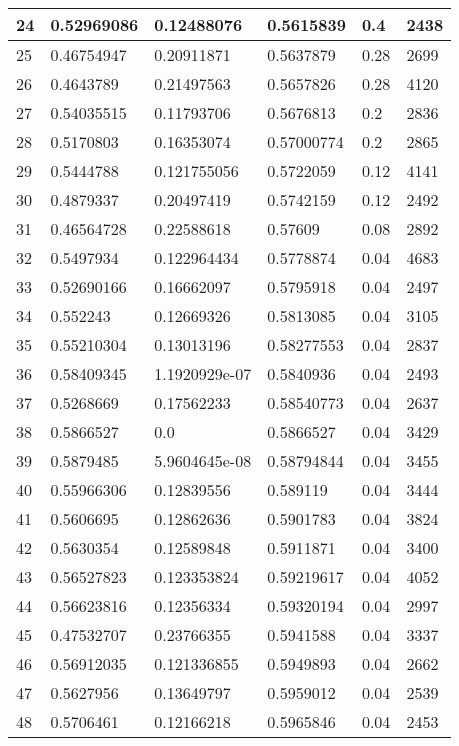 \begin{longtable}{|l|l|l|l|l|l|}
24 & 0.52969086 & 0.12488076 & 0.5615839 & 0.4 & 2438 \\ \hline 
25 & 0.46754947 & 0.20911871 & 0.5637879 & 0.28 & 2699 \\ \hline 
26 & 0.4643789 & 0.21497563 & 0.5657826 & 0.28 & 4120 \\ \hline 
27 & 0.54035515 & 0.11793706 & 0.5676813 & 0.2 & 2836 \\ \hline 
28 & 0.5170803 & 0.16353074 & 0.57000774 & 0.2 & 2865 \\ \hline 
29 & 0.5444788 & 0.121755056 & 0.5722059 & 0.12 & 4141 \\ \hline 
30 & 0.4879337 & 0.20497419 & 0.5742159 & 0.12 & 2492 \\ \hline 
31 & 0.46564728 & 0.22588618 & 0.57609 & 0.08 & 2892 \\ \hline 
32 & 0.5497934 & 0.122964434 & 0.5778874 & 0.04 & 4683 \\ \hline 
33 & 0.52690166 & 0.16662097 & 0.5795918 & 0.04 & 2497 \\ \hline 
34 & 0.552243 & 0.12669326 & 0.5813085 & 0.04 & 3105 \\ \hline 
35 & 0.55210304 & 0.13013196 & 0.58277553 & 0.04 & 2837 \\ \hline 
36 & 0.58409345 & 1.1920929e-07 & 0.5840936 & 0.04 & 2493 \\ \hline 
37 & 0.5268669 & 0.17562233 & 0.58540773 & 0.04 & 2637 \\ \hline 
38 & 0.5866527 & 0.0 & 0.5866527 & 0.04 & 3429 \\ \hline 
39 & 0.5879485 & 5.9604645e-08 & 0.58794844 & 0.04 & 3455 \\ \hline 
40 & 0.55966306 & 0.12839556 & 0.589119 & 0.04 & 3444 \\ \hline 
41 & 0.5606695 & 0.12862636 & 0.5901783 & 0.04 & 3824 \\ \hline 
42 & 0.5630354 & 0.12589848 & 0.5911871 & 0.04 & 3400 \\ \hline 
43 & 0.56527823 & 0.123353824 & 0.59219617 & 0.04 & 4052 \\ \hline 
44 & 0.56623816 & 0.12356334 & 0.59320194 & 0.04 & 2997 \\ \hline 
45 & 0.47532707 & 0.23766355 & 0.5941588 & 0.04 & 3337 \\ \hline 
46 & 0.56912035 & 0.121336855 & 0.5949893 & 0.04 & 2662 \\ \hline 
47 & 0.5627956 & 0.13649797 & 0.5959012 & 0.04 & 2539 \\ \hline 
48 & 0.5706461 & 0.12166218 & 0.5965846 & 0.04 & 2453 \\ \hline 

\end{longtable}
